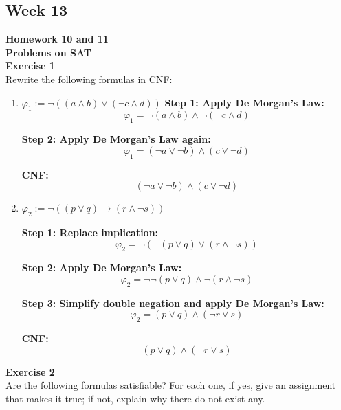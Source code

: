 \documentclass{article}
\theoremstyle{theorem}
\theoremstyle{definition}
\theoremstyle{remark}
\begin{document}
\subsection{Week 13}
\textbf{Homework 10 and 11}\\
\textbf{Problems on SAT}\\
\textbf{Exercise 1} \\
Rewrite the following formulas in CNF:
\begin{enumerate}
    \item $\varphi_1 := \neg((a \land b) \lor (\neg c \land d))$
    \textbf{Step 1: Apply De Morgan's Law:}
    \[
    \varphi_1 = \neg(a \land b) \land \neg(\neg c \land d)
    \]

    \textbf{Step 2: Apply De Morgan's Law again:}
    \[
    \varphi_1 = (\neg a \lor \neg b) \land (c \lor \neg d)
    \]

    \textbf{CNF:}
    \[
    (\neg a \lor \neg b) \land (c \lor \neg d)
    \]
    \item $\varphi_2 := \neg((p \lor q) \rightarrow (r \land \neg s))$

    \textbf{Step 1: Replace implication:}
    \[
    \varphi_2 = \neg(\neg(p \lor q) \lor (r \land \neg s))
    \]

    \textbf{Step 2: Apply De Morgan's Law:}
    \[
    \varphi_2 = \neg\neg(p \lor q) \land \neg(r \land \neg s)
    \]

    \textbf{Step 3: Simplify double negation and apply De Morgan's Law:}
    \[
    \varphi_2 = (p \lor q) \land (\neg r \lor s)
    \]

    \textbf{CNF:}
    \[
    (p \lor q) \land (\neg r \lor s)
    \]
\end{enumerate}

\textbf{Exercise 2} \\
Are the following formulas satisfiable? For each one, if yes, give an assignment that makes it true; if not, explain why there do not exist any.
\end{document}
